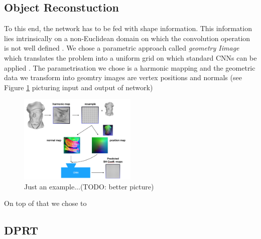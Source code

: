 \subsection{Object Reconstuction}
To this end, the network has to be fed with shape information. This information lies intrinsically on a non-Euclidean domain on which the convolution operation is not well defined \cite{Masci2015ShapeNetCN ,Geometric_deep_learning, CNN_on_Torus}. We chose a parametric approach called \textit{geometry Iimage } which translates the problem into a uniform grid on which standard CNNs can be applied \cite{gu2002geometry, sinha2016deep}. The parametrisation we chose is a harmonic mapping and the geometric data we transform into geomtry images are vertex positions and normals (see Figure \ref{Fig: Method_Overview} picturing input and output of network)
\begin{figure}[H]
  \centering
    \includegraphics[width=0.5\textwidth]{Figures/Overview_method}
     \caption{Just an example...(TODO: better picture)}
     \label{Fig: Method_Overview}
\end{figure}
On top of that we chose to 


\subsection{DPRT}



